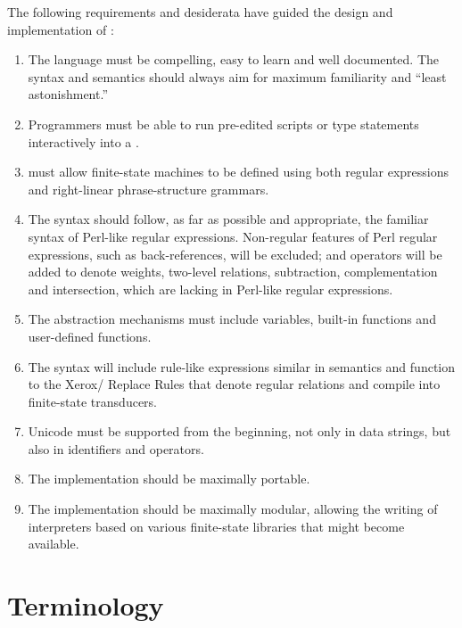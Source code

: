 The following requirements and desiderata have guided the design and
implementation of \Kleene{}:

\begin{enumerate}

\item
The \Kleene{} language must be compelling, easy to learn and well documented.  
The syntax and semantics should always aim for maximum
familiarity and ``least astonishment.''

\item
Programmers must be able to run pre-edited scripts or
type statements interactively into a .

\item
\Kleene{} must allow finite-state machines to be defined using 
both regular expressions and right-linear
phrase-structure grammars. 

\item
The syntax should follow, as far as
possible and appropriate, the familiar syntax of Perl-like regular
expressions.  Non-regular features of Perl regular expressions, 
such as back-references, will be
excluded; and operators will be added to denote weights,
two-level relations, subtraction, complementation and intersection, which are
lacking in Perl-like regular expressions.

\item
The abstraction mechanisms must include variables, built-in functions
and user-defined functions.


\item
The syntax will include rule-like expressions similar in semantics and 
function to the
Xerox/ Replace Rules
\citep{karttunen:1995,karttunen+kempe:1995,karttunen:1996,kempe+karttunen:1996,mohri+sproat:1996} that denote regular relations and
compile into finite-state transducers.  

\item
Unicode must be supported from the beginning, not only in data
strings, but also in \Kleene{} identifiers and operators.

\item
The implementation should be maximally portable.

\item
The implementation should be maximally modular, allowing the writing of
interpreters based on various finite-state libraries that might become
available.
\end{enumerate}

\section{Terminology}

